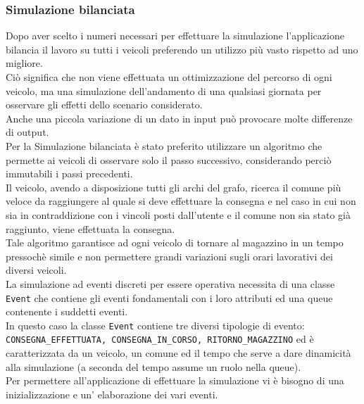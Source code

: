 \documentclass[a4paper,12pt]{report}
\begin{document}
\subsubsection{Simulazione bilanciata}
Dopo aver scelto i numeri necessari per effettuare la simulazione l'applicazione bilancia il lavoro su tutti i veicoli preferendo un utilizzo più vasto rispetto ad uno migliore.\\
Ciò significa che non viene effettuata un ottimizzazione del percorso di ogni veicolo, ma una simulazione dell'andamento di una qualsiasi giornata per osservare gli effetti dello scenario considerato.\\
Anche una piccola variazione di un dato in input può provocare molte differenze di output.\\
Per la Simulazione bilanciata è stato preferito utilizzare un algoritmo che permette ai veicoli di osservare solo il
passo successivo, considerando perciò immutabili i passi precedenti.\\
Il veicolo, avendo a disposizione tutti gli archi del grafo, ricerca il comune più veloce da raggiungere
al quale si deve effettuare la consegna e nel caso in cui non sia in contraddizione con
i vincoli posti dall'utente e il comune non sia stato già raggiunto, viene effettuata la consegna.\\
Tale algoritmo garantisce ad ogni veicolo di tornare al magazzino in un tempo pressochè simile e 
non permettere grandi variazioni sugli orari lavorativi dei diversi veicoli.\\
La simulazione ad eventi discreti per essere operativa necessita di una classe \texttt{Event} che contiene
gli eventi fondamentali con i loro attributi ed una queue contenente i suddetti eventi.\\
In questo caso la classe \texttt{Event} contiene tre diversi tipologie di evento: \texttt{CONSEGNA\_EFFETTUATA, CONSEGNA\_IN\_CORSO, RITORNO\_MAGAZZINO} ed è caratterizzata da un veicolo, un comune ed il tempo
che serve a dare dinamicità alla simulazione (a seconda del tempo assume un ruolo nella queue).\\
Per permettere all'applicazione di effettuare la simulazione vi è bisogno di una inizializzazione
e un' elaborazione dei vari eventi.\\
\end{document}
